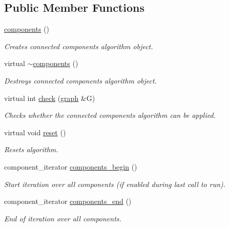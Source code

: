 \subsection*{Public Member Functions}
\begin{DoxyCompactItemize}
\item 
\mbox{\hyperlink{classcomponents_a41b8782301c7985dfa202a04df76712d}{components}} ()
\begin{DoxyCompactList}\small\item\em Creates connected components algorithm object. \end{DoxyCompactList}\item 
virtual \mbox{\hyperlink{classcomponents_aa38e55d08dd484dad3175617264056a5}{$\sim$components}} ()
\begin{DoxyCompactList}\small\item\em Destroys connected components algorithm object. \end{DoxyCompactList}\item 
virtual int \mbox{\hyperlink{classcomponents_aeeda901d02c65d6c31c8b6148540d7c1}{check}} (\mbox{\hyperlink{classgraph}{graph}} \&G)
\begin{DoxyCompactList}\small\item\em Checks whether the connected components algorithm can be applied. \end{DoxyCompactList}\item 
virtual void \mbox{\hyperlink{classcomponents_a07b6bab5962524ae26ccb478b35cd76c}{reset}} ()
\begin{DoxyCompactList}\small\item\em Resets algorithm. \end{DoxyCompactList}\item 
component\+\_\+iterator \mbox{\hyperlink{classcomponents_a8a645639044375cdaefabffda3ae70e0}{components\+\_\+begin}} ()
\begin{DoxyCompactList}\small\item\em Start iteration over all components (if enabled during last call to run). \end{DoxyCompactList}\item 
component\+\_\+iterator \mbox{\hyperlink{classcomponents_a8537c6e4c6a29a4ae05a937b5fda1fb9}{components\+\_\+end}} ()
\begin{DoxyCompactList}\small\item\em End of iteration over all components. \end{DoxyCompactList}\item 

\end{DoxyCompactItemize}
